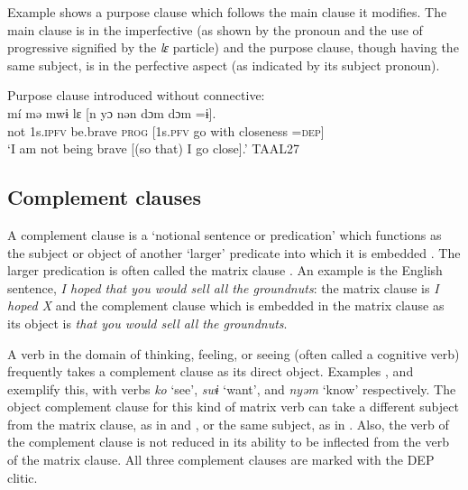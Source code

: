 \documentclass[output=paper]{langscibook}
\begin{document}
\noindent Example  shows a purpose clause which follows the main clause it modifies. The main clause is in the imperfective (as shown by the pronoun and the use of progressive signified by the \textit{lɛ} particle) and the purpose clause, though having the same subject, is in the perfective aspect (as indicated by its subject pronoun).

\ea Purpose clause introduced without connective:
\label{ex:dettweiler:TAAL27} \\
\gll mí mə mwɨ lɛ [n yɔ nən {dɔm dɔm} =ɨ]. \\
not 1s.\textsc{ipfv} be.brave \textsc{prog} [1s.\textsc{pfv} go with closeness =\textsc{dep}] \\
\glt `I am not being brave [(so that) I go close].' TAAL27
\z

\subsection{Complement clauses}

A complement clause is a `notional sentence or predication' which functions as the subject or object of another `larger' predicate into which it is embedded \citep[52]{Noonan2007}. The larger predication is often called the matrix clause \citep[313]{Payne1997}. An example is the English sentence, \textit{I hoped that you would sell all the groundnuts}: the matrix clause is \textit{I hoped X} and the complement clause which is embedded in the matrix clause as its object is \textit{that you would sell all the groundnuts}.

A verb in the domain of thinking, feeling, or seeing (often called a cognitive verb) frequently takes a complement clause as its direct object. Examples ,  and  exemplify this, with verbs \textit{ko} `see', \textit{swɨ} `want', and \textit{nyəm} `know' respectively. The object complement clause for this kind of matrix verb can take a different subject from the matrix clause, as in  and , or the same subject, as in . Also, the verb of the complement clause is not reduced in its ability to be inflected from the verb of the matrix clause. All three complement clauses are marked with the DEP clitic.
\end{document}
